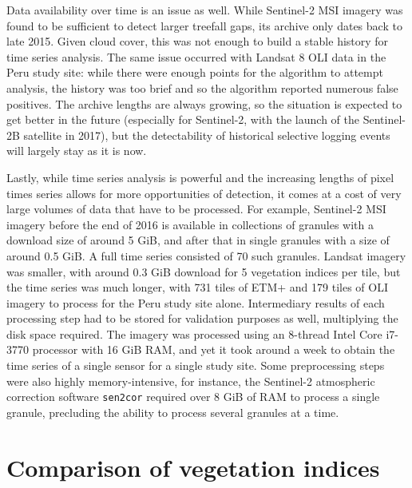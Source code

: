 \documentclass[a4paper,12pt]{scrbook}
\begin{document}
Data availability over time is an issue as well. While Sentinel-2 \ac{MSI} imagery was found to be sufficient to detect larger treefall gaps, its archive only dates back to late 2015. Given cloud cover, this was not enough to build a stable history for time series analysis. The same issue occurred with Landsat 8 \ac{OLI} data in the Peru study site: while there were enough points for the algorithm to attempt analysis, the history was too brief and so the algorithm reported numerous false positives. The archive lengths are always growing, so the situation is expected to get better in the future (especially for Sentinel-2, with the launch of the Sentinel-2B satellite in 2017), but the detectability of historical selective logging events will largely stay as it is now.

Lastly, while time series analysis is powerful and the increasing lengths of pixel times series allows for more opportunities of detection, it comes at a cost of very large volumes of data that have to be processed. For example, Sentinel-2 \ac{MSI} imagery before the end of 2016 is available in collections of granules with a download size of around 5 \ac{GiB}, and after that in single granules with a size of around 0.5 \ac{GiB}. A full time series consisted of 70 such granules. Landsat imagery was smaller, with around 0.3 \ac{GiB} download for 5 vegetation indices per tile, but the time series was much longer, with 731 tiles of \ac{ETM+} and 179 tiles of \ac{OLI} imagery to process for the Peru study site alone. Intermediary results of each processing step had to be stored for validation purposes as well, multiplying the disk space required. The imagery was processed using an 8-thread Intel Core i7-3770 processor with 16 \ac{GiB} \ac{RAM}, and yet it took around a week to obtain the time series of a single sensor for a single study site. Some preprocessing steps were also highly memory-intensive, for instance, the Sentinel-2 atmospheric correction software \texttt{sen2cor} required over 8 \ac{GiB} of \ac{RAM} to process a single granule, precluding the ability to process several granules at a time.

\section{Comparison of vegetation indices}
\end{document}
